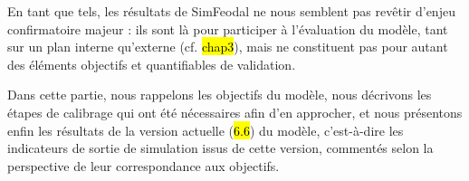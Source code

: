 En tant que tels, les \og résultats\fg{} de SimFeodal ne nous semblent pas revêtir d'enjeu confirmatoire majeur : ils sont là pour participer à l'évaluation du modèle, tant sur un plan interne qu'externe (cf. \hl{chap3}), mais ne constituent pas pour autant des éléments objectifs et quantifiables de validation.

Dans cette partie, nous rappelons les objectifs du modèle, nous décrivons les étapes de calibrage qui ont été nécessaires afin d'en approcher, et nous présentons enfin les résultats de la version actuelle (\hl{6.6}) du modèle, c'est-à-dire les indicateurs de sortie de simulation issus de cette version, commentés selon la perspective de leur correspondance aux objectifs.
%
%
%
%
